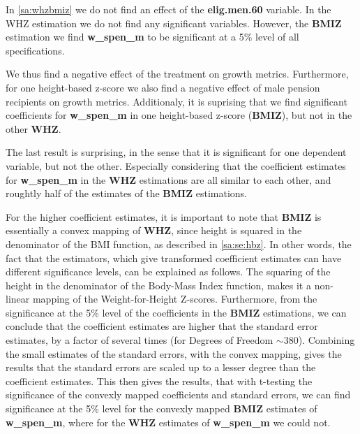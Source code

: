 \begin{refsection}
In \autoref{sa:whzbmiz} we do not find an effect of the \textbf{elig.men.60} variable.
In the WHZ estimation we do not find any significant variables.
However, the \textbf{BMIZ} estimation we find \textbf{w\_spen\_m} to be significant at a 5\% level of all specifications.

We thus find a negative effect of the treatment on growth metrics.
Furthermore, for one height-based z-score we also find a negative effect of male pension recipients on growth metrics.
Additionaly, it is suprising that we find significant coefficients for \textbf{w\_spen\_m} in one height-based z-score (\textbf{BMIZ}), but not in the other \textbf{WHZ}.

The last result is surprising, in the sense that it is significant for one dependent variable, but not the other.
Especially considering that the coefficient estimates for \textbf{w\_spen\_m} in the \textbf{WHZ} estimations are all similar to each other,
and roughtly half of the estimates of the \textbf{BMIZ} estimations.

For the higher coefficient estimates, it is important to note that \textbf{BMIZ} is essentially a convex mapping of \textbf{WHZ},
since height is squared in the denominator of the BMI function, as described in \autoref{sa:se:hbz}.
In other words, the fact that the estimators, which give transformed coefficient estimates can have different significance levels,
can be explained as follows.
The squaring of the height in the denominator of the Body-Mass Index function, makes it a non-linear mapping of the Weight-for-Height Z-scores.
Furthermore, from the significance at the 5\% level of the coefficients in the \textbf{BMIZ} estimations,
we can conclude that the coefficient estimates are higher that the standard error estimates,
by a factor of several times (for Degrees of Freedom $\sim 380$).
Combining the small estimates of the standard errors, with the convex mapping,
gives the results that the standard errors are scaled up to a lesser degree than the coefficient estimates.
This then gives the results, that with t-testing the significance of the convexly mapped coefficients and standard errors,
we can find significance at the 5\% level for the convexly mapped \textbf{BMIZ} estimates of \textbf{w\_spen\_m},
where for the \textbf{WHZ} estimates of \textbf{w\_spen\_m} we could not.


\end{refsection}
